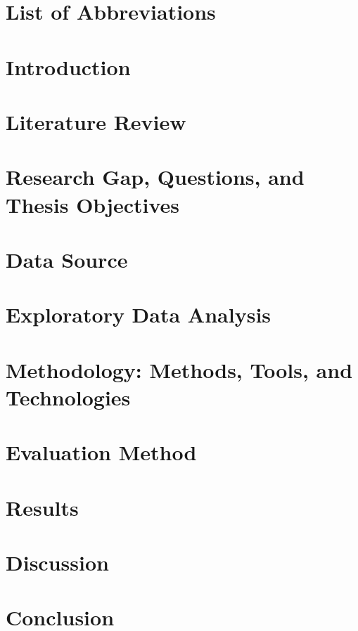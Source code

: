 \documentclass{srhthesis}
\begin{document}
\maketitle

\begin{abstract}

\end{abstract}

\thesisTables

\cleardoublepage
{}
\chapter*{List of Abbreviations}


\thesisBodyStart

\chapter{Introduction}


\chapter{Literature Review}


\chapter{Research Gap, Questions, and Thesis Objectives}


\chapter{Data Source}


\chapter{Exploratory Data Analysis}


\chapter{Methodology: Methods, Tools, and Technologies}


\chapter{Evaluation Method}


\chapter{Results}


\chapter{Discussion}


\chapter{Conclusion}


\printReferences
\end{document}
